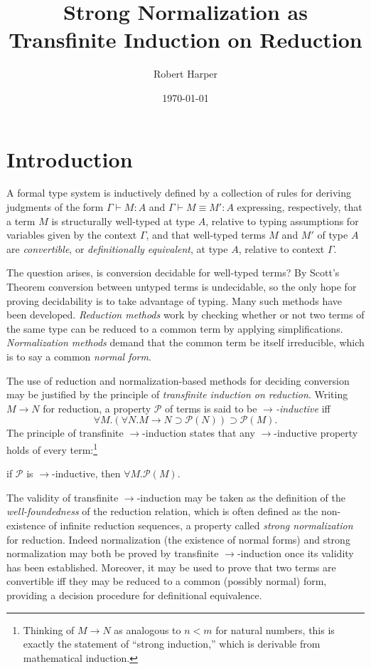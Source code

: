 \documentclass[11pt,twoside]{article}
\begin{document}
\title{Strong Normalization as Transfinite Induction on Reduction}
\author{Robert Harper}
\date{\today}

\maketitle{}

\section{Introduction}

A formal type system is inductively defined by a collection of rules for deriving
judgments of the form $\Gamma\vdash M:A$ and $\Gamma\vdash M\equiv M':A$ expressing, respectively, that a term
$M$ is structurally well-typed at type $A$, relative to typing assumptions for variables
given by the context $\Gamma$, and that well-typed terms $M$ and $M'$ of type $A$ are
\emph{convertible}, or \emph{definitionally equivalent}, at type $A$, relative to context
$\Gamma$.

The question arises, is conversion decidable for well-typed terms?  By Scott's Theorem
conversion between untyped terms is undecidable, so the only hope for proving decidability
is to take advantage of typing.  Many such methods have been developed.
\emph{Reduction methods} work by checking whether or not two terms of the same
type can be reduced to a common term by applying simplifications.
\emph{Normalization methods} demand that the common term be itself irreducible,
which is to say a common \emph{normal form}.

The use of reduction and normalization-based methods for deciding conversion may be
justified by the principle of \emph{transfinite induction on reduction}.  Writing $M\to N$
for reduction, a property $\mathcal{P}$ of terms is said to be \emph{$\to$-inductive} iff
\begin{displaymath}
  \forall M.(\forall N.M\to N\supset\mathcal{P}(N))\supset\mathcal{P}(M).
\end{displaymath}
The principle of transfinite $\to$-induction states that any $\to$-inductive property holds of
every term:\footnote{Thinking of $M\to N$ as analogous to $n<m$ for natural numbers, this
  is exactly the statement of ``strong induction,'' which is derivable from mathematical
  induction.}
\begin{center}
  if $\mathcal{P}$ is $\to$-inductive, then $\forall M.\mathcal{P}(M)$.
\end{center}
The validity of transfinite $\to$-induction may be taken as the definition of the
\emph{well-foundedness} of the reduction relation, which is often defined as the
non-existence of infinite reduction sequences, a property called \emph{strong
  normalization} for reduction.  Indeed normalization (the existence of normal forms) and
strong normalization may both be proved by transfinite $\to$-induction once its validity has
been established.  Moreover, it may be used to prove that two terms are convertible iff
they may be reduced to a common (possibly normal) form, providing a decision procedure for
definitional equivalence.
\end{document}
